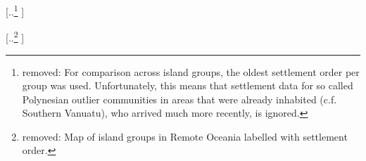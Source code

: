 \documentclass[unnumsec,webpdf,modern,medium]{oup-authoring-template}
\providecommand{\DIFdeltex}[1]{{\protect\color{red} [..\footnote{removed: #1} ]}} %
\providecommand{\DIFdelbegin}{} %
\providecommand{\DIFdelend}{} %
\providecommand{\DIFdel}[1]{\texorpdfstring{\DIFdeltex{#1}}{}} %
\newcommand{\DIFscaledelfig}{0.5}
\newlength{\DIFdelgraphicswidth} %
\newlength{\DIFdelgraphicsheight} %
\newcommand{\DIFdelincludegraphics}[2][]{%
\sbox{\DIFdelgraphicsbox}{\DIFOincludegraphics[#1]{#2}}%
\settoboxwidth{\DIFdelgraphicswidth}{\DIFdelgraphicsbox} %
\settoboxtotalheight{\DIFdelgraphicsheight}{\DIFdelgraphicsbox} %
\scalebox{\DIFscaledelfig}{%
\parbox[b]{\DIFdelgraphicswidth}{\usebox{\DIFdelgraphicsbox}\\[-\baselineskip] \rule{\DIFdelgraphicswidth}{0em}}\llap{\resizebox{\DIFdelgraphicswidth}{\DIFdelgraphicsheight}{%
\setlength{\unitlength}{\DIFdelgraphicswidth}%
\begin{picture}(1,1)%
\thicklines\linethickness{2pt} %
{\color[rgb]{1,0,0}\put(0,0){\framebox(1,1){}}}%
{\color[rgb]{1,0,0}\put(0,0){\line( 1,1){1}}}%
{\color[rgb]{1,0,0}\put(0,1){\line(1,-1){1}}}%
\end{picture}%
}\hspace*{3pt}}} %
} %
\DeclareRobustCommand{\DIFdelbegin}{\DIFOdelbegin \let\includegraphics\DIFdelincludegraphics} %
\DeclareRobustCommand{\DIFdelend}{\DIFOaddend \let\includegraphics\DIFOincludegraphics} %
\begin{document}
\DIFdelbegin \DIFdel{For comparison across island groups, the oldest settlement order per group was used. Unfortunately, this means that settlement data for so called Polynesian outlier communities in areas that were already inhabited (c.f. Southern Vanuatu), who arrived much more recently, is ignored.
}\DIFdelend %

\DIFdelbegin %
{%
\DIFdel{Map of island groups in Remote Oceania labelled with settlement order.}%
}
\DIFdelend %
\end{document}
